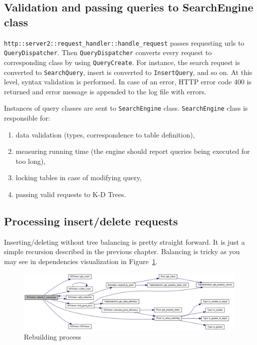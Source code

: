 \documentclass[10pt,a4paper]{article}
\begin{document}
\subsection{Validation and passing queries to SearchEngine class}

\verb|http::server2::request_handler::handle_request| passes requesting urls to \verb|QueryDispatcher|. Then \verb|QueryDispatcher| converts every request to corresponding class by using \verb|QueryCreate|. For instance, the search request is converted to \verb|SearchQuery|, insert is converted to \verb|InsertQuery|, and so on. At this level, syntax validation is performed. In case of an error, HTTP error code 400 is returned and error message is appended to the log file with errors. 

Instances of query classes are sent to \verb|SearchEngine| class. \verb|SearchEngine| class is responsible for:
\begin{enumerate}
\item data validation (types, correspondence to table definition),
\item measuring running time (the engine should report queries being executed for too long),
\item locking tables in case of modifying query,
\item passing valid requests to K-D Trees.
\end{enumerate}

\subsection{Processing insert/delete requests}

Inserting/deleting without tree balancing is pretty straight forward. It is just a simple recursion described in the previous chapter. Balancing is tricky as you may see in dependencies visualization in Figure~\ref{fig:rebuild}.

\begin{figure}[h!]
\centering
  \includegraphics[width=16cm]{rebuild}
  \caption{Rebuilding process}
  \label{fig:rebuild}
\end{figure}
\end{document}
